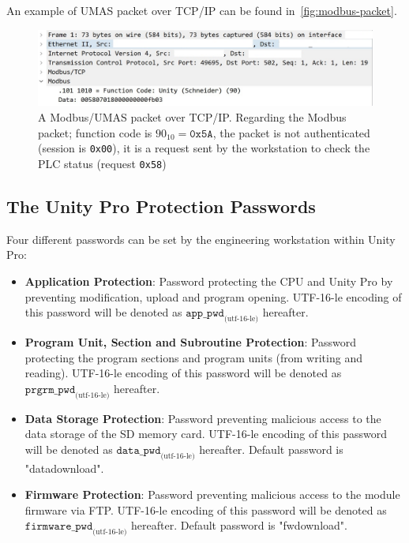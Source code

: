 An example of UMAS packet over TCP/IP can be found in~\autoref{fig:modbus-packet}.

\begin{figure}[H]
    \centering
    \includegraphics[width=0.8\linewidth]{figures/typical_modbus_packet.jpg}
    \caption{A Modbus/UMAS packet over TCP/IP. Regarding the Modbus packet; function code is $90_{10} = \texttt{0x5A}$, the packet is not authenticated (session is \texttt{0x00}), it is a request sent by the workstation to check the PLC status (request \texttt{0x58})}
    \label{fig:modbus-packet}
\end{figure}

\subsection{The Unity Pro Protection Passwords}

Four different passwords can be set by the engineering workstation within Unity Pro:
\begin{itemize}
    \item \textbf{Application Protection}: Password protecting the CPU and Unity Pro by preventing modification, upload and program opening. UTF-16-le encoding of this password will be denoted as $\texttt{app\_pwd}_{\textrm{(utf-16-le)}}$ hereafter.
    \item \textbf{Program Unit, Section and Subroutine Protection}: Password protecting the program sections and program units (from writing and reading). UTF-16-le encoding of this password will be denoted as $\texttt{prgrm\_pwd}_{\textrm{(utf-16-le)}}$ hereafter.
    \item \textbf{Data Storage Protection}: Password preventing malicious access to the data storage of the SD memory card. UTF-16-le encoding of this password will be denoted as $\texttt{data\_pwd}_{\textrm{(utf-16-le)}}$ hereafter. Default password is "datadownload".
    \item \textbf{Firmware Protection}: Password preventing malicious access to the module firmware via FTP. UTF-16-le encoding of this password will be denoted as $\texttt{firmware\_pwd}_{\textrm{(utf-16-le)}}$ hereafter. Default password is "fwdownload".
\end{itemize}

